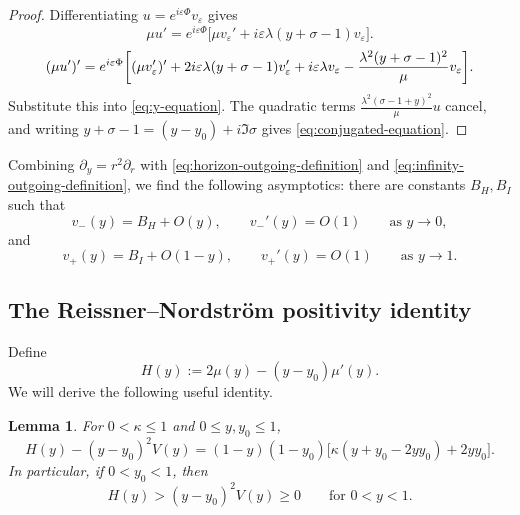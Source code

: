 \documentclass[11pt]{article}
\numberwithin{equation}{section}
\newtheorem{lemma}[theorem]{Lemma}
\begin{document}
	\begin{proof}
		Differentiating $u=e^{i\varepsilon\Phi}v_\varepsilon$ gives
		\begin{equation}
			\mu u'=e^{i\varepsilon\Phi}
			\bigl[\mu v_\varepsilon'
			+i\varepsilon\lambda(y+\sigma-1)v_\varepsilon\bigr].
			\label{eq:first-conjugated-derivative}
		\end{equation}
		\begin{align}
			(\mu u')'=e^{i\varepsilon\Phi}\biggl[
			(\mu v_\varepsilon')'
			+2i\varepsilon\lambda(y+\sigma-1)v_\varepsilon'
			+i\varepsilon\lambda v_\varepsilon\notag
			-\frac{\lambda^2(y+\sigma-1)^2}{\mu}v_\varepsilon\biggr].
			\label{eq:second-conjugated-derivative}
		\end{align}
		Substitute this into \eqref{eq:y-equation}. The quadratic 
		terms $\frac{\lambda^2(\sigma-1+y)^2}{\mu}u$ cancel, and writing
		$y+\sigma-1=(y-y_0)+i\Im\sigma$ gives
		\eqref{eq:conjugated-equation}.
	\end{proof}
	
	Combining $\partial_y=r^2\partial_r$ with  \eqref{eq:horizon-outgoing-definition} and \eqref{eq:infinity-outgoing-definition},  we find the following asymptotics: there are constants $B_H,B_I$
	such that
	\begin{equation}
		v_-(y)=B_H+O(y),\qquad v_-'(y)=O(1)
		\qquad\text{as }y\rightarrow 0,
		\label{eq:v-minus-endpoint}
	\end{equation}
	and
	\begin{equation}
		v_+(y)=B_I+O(1-y),\qquad v_+'(y)=O(1)
		\qquad\text{as }y\rightarrow 1.
		\label{eq:v-plus-endpoint}
	\end{equation}
	
	
	\subsection{The Reissner--Nordstr\"om positivity identity}
	
	Define
	\begin{equation}
		H(y):=2\mu(y)-(y-y_0)\mu'(y).
		\label{eq:H-definition}
	\end{equation}
	We will derive the following useful identity.
	\begin{lemma}
		\label{lem:key-factorization}
		For $0<\kappa\leq1$ and $0\leq y,y_0\leq1$,
		\begin{equation}
			H(y)-(y-y_0)^2V(y)
			=(1-y)(1-y_0)
			\bigl[\kappa(y+y_0-2yy_0)+2yy_0\bigr].
			\label{eq:key-factorization}
		\end{equation}
		In particular, if $0<y_0<1$, then
		\begin{equation}
			H(y)>(y-y_0)^2V(y)\geq0
			\qquad\text{for }0<y<1.
			\label{eq:H-strict-positive}
		\end{equation}
	\end{lemma}
	
\end{document}
